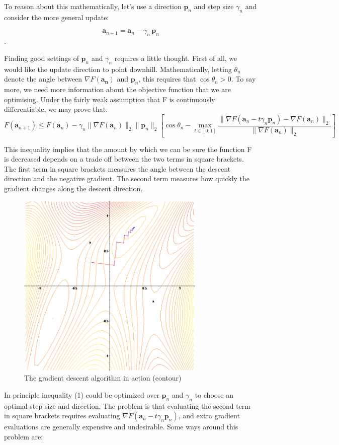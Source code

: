 \documentclass[11pt]{article}
\begin{document}
To reason about this mathematically, let's use a direction \(\mathbf {p} _{n}\) and step size \(\gamma _{n}\) and consider the more general update:

    \[ \mathbf {a} _{n+1}=\mathbf {a} _{n}-\gamma _{n}\,\mathbf {p} _{n}\].

Finding good settings of \( \mathbf {p} _{n}\) and \( \gamma _{n}\) requires a little thought. First of all, we would like the update direction to point downhill. Mathematically, letting \( \theta _{n}\) denote the angle between \( \nabla F(\mathbf {a_{n}} )\) and \( \mathbf {p} _{n}\), this requires that \( \cos \theta _{n}>0.\) To say more, we need more information about the objective function that we are optimising. Under the fairly weak assumption that F is continuously differentiable, we may prove that:
\begin{equation}
    F(\mathbf {a} _{n+1})\leq F(\mathbf {a} _{n})-\gamma _{n}\|\nabla F(\mathbf {a} _{n})\|_{2}\|\mathbf {p} _{n}\|_{2}\left[\cos \theta _{n}-\max _{t\in [0,1]}{\frac {\|\nabla F(\mathbf {a} _{n}-t\gamma _{n}\mathbf {p} _{n})-\nabla F(\mathbf {a} _{n})\|_{2}}{\|\nabla F(\mathbf {a} _{n})\|_{2}}}\right]
\end{equation}

This inequality implies that the amount by which we can be sure the function F is decreased depends on a trade off between the two terms in square brackets. The first term in square brackets measures the angle between the descent direction and the negative gradient. The second term measures how quickly the gradient changes along the descent direction.
\begin{figure}
    \centering
    \includegraphics[width=9cm]{photo/4.png}
    \caption{The gradient descent algorithm in action (contour)}
    \label{fig:ss2}
\end{figure}
In principle inequality (1) could be optimized over \(\mathbf {p} _{n}\) and \(\gamma _{n}\) to choose an optimal step size and direction. The problem is that evaluating the second term in square brackets requires evaluating \(\nabla F(\mathbf {a} _{n}-t\gamma _{n}\mathbf {p} _{n})\), and extra gradient evaluations are generally expensive and undesirable. Some ways around this problem are:\\
\end{document}

